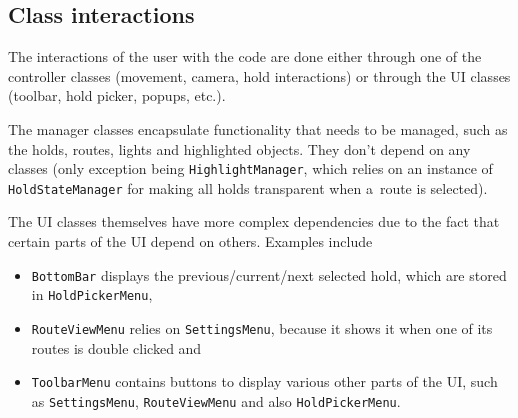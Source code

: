 \subsection{Class interactions}

The interactions of the user with the code are done either through one of the controller classes (movement, camera, hold interactions) or through the UI classes (toolbar, hold picker, popups, etc.).

The manager classes encapsulate functionality that needs to be managed, such as the holds, routes, lights and highlighted objects.
They don't depend on any classes (only exception being \verb|HighlightManager|, which relies on an instance of \verb|HoldStateManager| for making all holds transparent when a~route is selected).

The UI classes themselves have more complex dependencies due to the fact that certain parts of the UI depend on others. 
Examples include
\begin{itemize}
		\item \verb|BottomBar| displays the previous/current/next selected hold, which are stored in \verb|HoldPickerMenu|,
		\item \verb|RouteViewMenu| relies on \verb|SettingsMenu|, because it shows it when one of its routes is double clicked and
		\item \verb|ToolbarMenu| contains buttons to display various other parts of the UI, such as \verb|SettingsMenu|, \verb|RouteViewMenu| and also \verb|HoldPickerMenu|.
\end{itemize}
